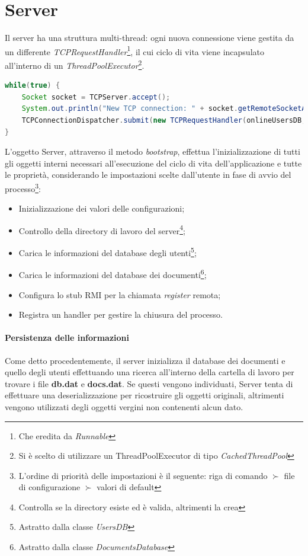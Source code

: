 \section{Server}
Il server ha una struttura multi-thread: ogni nuova connessione viene gestita da un differente \textit{TCPRequestHandler}\footnote{Che eredita da \textit{Runnable}}, il cui ciclo di vita viene incapsulato all'interno di un \textit{ThreadPoolExecutor}\footnote{Si è scelto di utilizzare un ThreadPoolExecutor di tipo \textit{CachedThreadPool}}. 

\begin{lstlisting}[caption="Gestione di una nuova connessione", language=java]
while(true) {
	Socket socket = TCPServer.accept();
	System.out.println("New TCP connection: " + socket.getRemoteSocketAddress().toString());
	TCPConnectionDispatcher.submit(new TCPRequestHandler(onlineUsersDB, usersDB, documentDatabase, cdaManager, socket));
}
\end{lstlisting}

L'oggetto Server, attraverso il metodo \textit{bootstrap}, effettua l'inizializzazione di tutti gli oggetti interni necessari all'esecuzione del ciclo di vita dell'applicazione e tutte le proprietà, considerando le impostazioni scelte dall'utente in fase di avvio del processo\footnote{L'ordine di priorità delle impostazioni è il seguente: riga di comando $\succ$ file di configurazione $\succ$ valori di default}:
\begin{itemize}
	\item Inizializzazione dei valori delle configurazioni;
	\item Controllo della directory di lavoro del server\footnote{Controlla se la directory esiste ed è valida, altrimenti la crea};
	\item Carica le informazioni del database degli utenti\footnote{Astratto dalla classe \textit{UsersDB}};
	\item Carica le informazioni del database dei documenti\footnote{Astratto dalla classe \textit{DocumentsDatabase}};
	\item Configura lo stub RMI per la chiamata \textit{register} remota;
	\item Registra un handler per gestire la chiusura del processo.
\end{itemize}

\paragraph{Persistenza delle informazioni}
Come detto procedentemente, il server inizializza il database dei documenti e quello degli utenti effettuando una ricerca all'interno della cartella di lavoro per trovare i file \textbf{db.dat} e \textbf{docs.dat}. Se questi vengono individuati, Server tenta di effettuare una deserializzazione per ricostruire gli oggetti originali, altrimenti vengono utilizzati degli oggetti vergini non contenenti alcun dato.

